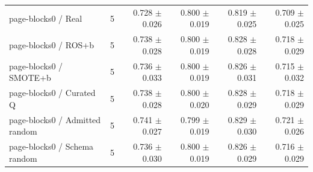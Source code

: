 \begin{table}[!t]
\begin{tabular}{lrrrrr}
page-blocks0 / Real & 5 & 0.728 $\pm$ 0.026 & 0.800 $\pm$ 0.019 & 0.819 $\pm$ 0.025 & 0.709 $\pm$ 0.025 \\
page-blocks0 / ROS+b & 5 & 0.738 $\pm$ 0.028 & 0.800 $\pm$ 0.019 & 0.828 $\pm$ 0.028 & 0.718 $\pm$ 0.029 \\
page-blocks0 / SMOTE+b & 5 & 0.736 $\pm$ 0.033 & 0.800 $\pm$ 0.019 & 0.826 $\pm$ 0.031 & 0.715 $\pm$ 0.032 \\
page-blocks0 / Curated Q & 5 & 0.738 $\pm$ 0.028 & 0.800 $\pm$ 0.020 & 0.828 $\pm$ 0.029 & 0.718 $\pm$ 0.029 \\
page-blocks0 / Admitted random & 5 & 0.741 $\pm$ 0.027 & 0.799 $\pm$ 0.019 & 0.829 $\pm$ 0.030 & 0.721 $\pm$ 0.026 \\
page-blocks0 / Schema random & 5 & 0.736 $\pm$ 0.030 & 0.800 $\pm$ 0.019 & 0.826 $\pm$ 0.029 & 0.716 $\pm$ 0.029 \\
\bottomrule
\end{tabular}
\end{table}
